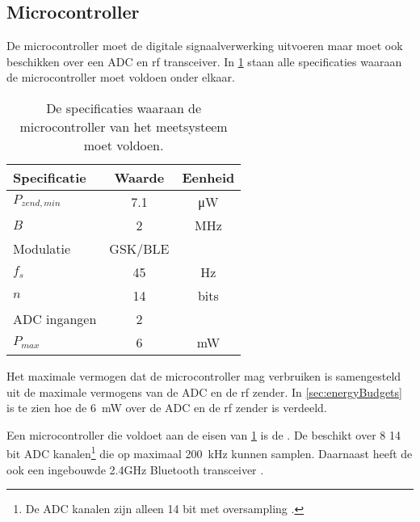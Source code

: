 \subsection{Microcontroller}
De microcontroller moet de digitale signaalverwerking uitvoeren maar moet ook beschikken over een ADC en rf transceiver. In \cref{tab:specMCU} staan alle specificaties waaraan de microcontroller moet voldoen onder elkaar.
\begin{table}[!htbp]
    \centering
    \begin{tabular}{l|c|c}
        Specificatie    & Waarde    & Eenheid \\\hline
        $P_{zend,min}$  & 7.1       & \si{\micro\watt}  \\
        $B$             & 2         & \si{\mega\hertz}  \\
        Modulatie       & GSK/BLE   &                   \\\hline
        $f_s$           & 45        & \si{\hertz}       \\
        $n$             & 14        & bits              \\
        ADC ingangen    & 2         &                   \\\hline
        $P_{max}$       & 6         & \si{\milli\watt}
    \end{tabular}
    \caption{De specificaties waaraan de microcontroller van het \si{\pH} meetsysteem moet voldoen.}
    \label{tab:specMCU}
\end{table}
Het maximale vermogen dat de microcontroller mag verbruiken is samengesteld uit de maximale vermogens van de ADC en de rf zender. In \cref{sec:energyBudgets} is te zien hoe de \qty{6}{\milli\watt} over de ADC en de rf zender is verdeeld.


Een microcontroller die voldoet aan de eisen van \cref{tab:specMCU} is de \mcu. De \mcu beschikt over 8 14 bit ADC kanalen\footnote{De ADC kanalen zijn alleen 14 bit met oversampling \cite{nrf52810}.} die op maximaal \qty{200}{\kilo\hertz} kunnen samplen. Daarnaast heeft de \mcu ook een ingebouwde 2.4GHz Bluetooth transceiver \cite{nrf52810}.

